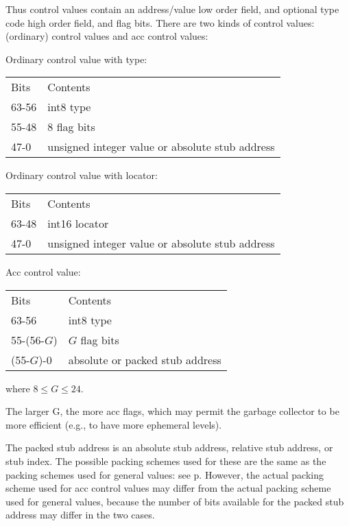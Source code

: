 \documentclass[12pt]{article}
\newcommand{\pagref}[1]{p\pageref{#1}}
\newenvironment{indpar}[1][0.3in]%
	{\begin{list}{}%
		     {\setlength{\itemsep}{0in}%
		      \setlength{\topsep}{0in}%
		      \setlength{\parsep}{1ex}%
		      \setlength{\labelwidth}{#1}%
		      \setlength{\leftmargin}{#1}%
		      \addtolength{\leftmargin}{\labelsep}}%
	 \item}%
	{\end{list}}
\begin{document}
Thus control values contain an address/value low order field, and optional
type code high order field, and flag bits.  There are two kinds of
control values: (ordinary) control values and acc control values:

\begin{indpar}
Ordinary control value with type: \\[1ex]
\hspace*{0.2in}\begin{tabular}{ll}
Bits & Contents \\[1ex]
63-56 & int8 type \\
55-48 & 8 flag bits \\
47-0 & unsigned integer value or absolute stub address
\end{tabular}

Ordinary control value with locator: \\[1ex]
\hspace*{0.2in}\begin{tabular}{ll}
Bits & Contents \\[1ex]
63-48 & int16 locator \\
47-0 & unsigned integer value or absolute stub address
\end{tabular}

Acc control value: \\[1ex]
\hspace*{0.2in}\begin{tabular}{ll}
Bits & Contents \\[1ex]
63-56 & int8 type \\
55-(56-$G$) & $G$ flag bits \\
(55-$G$)-0 & absolute or packed stub address
\end{tabular}

where $8\leq G\leq 24$.
\end{indpar}

The larger G, the more acc flags, which may permit the
garbage collector to be more efficient (e.g., to have more ephemeral
levels).

The packed stub address is an absolute stub address,
relative stub address, or stub index.  The possible packing schemes used for
these are the same as the packing schemes used for general values:
see \pagref{STUB-ADDRESS-PACKING}.  However, the actual packing scheme
used for acc control values may differ from the actual packing scheme
used for general values, because the number of bits available for the
packed stub address may differ in the two cases.
\end{document}
